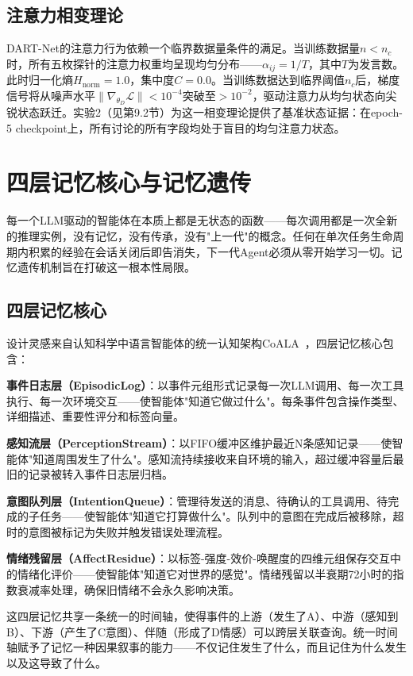 \documentclass[12pt,a4paper]{ctexart}
\begin{document}
\subsection{注意力相变理论}

DART-Net的注意力行为依赖一个临界数据量条件的满足。当训练数据量$n < n_c$时，所有五枚探针的注意力权重均呈现均匀分布——$\alpha_{ij} = 1/T$，其中$T$为发言数。此时归一化熵$H_{\text{norm}} = 1.0$，集中度$C = 0.0$。当训练数据达到临界阈值$n_c$后，梯度信号将从噪声水平$\|\nabla_{\theta_D} \mathcal{L}\| < 10^{-4}$突破至$> 10^{-2}$，驱动注意力从均匀状态向尖锐状态跃迁。实验2（见第9.2节）为这一相变理论提供了基准状态证据：在epoch-5 checkpoint上，所有讨论的所有字段均处于盲目的均匀注意力状态。

\section{四层记忆核心与记忆遗传}

每一个LLM驱动的智能体在本质上都是无状态的函数——每次调用都是一次全新的推理实例，没有记忆，没有传承，没有"上一代"的概念。任何在单次任务生命周期内积累的经验在会话关闭后即告消失，下一代Agent必须从零开始学习一切。记忆遗传机制旨在打破这一根本性局限。

\subsection{四层记忆核心}

设计灵感来自认知科学中语言智能体的统一认知架构CoALA~\cite{sumers2023coala}，四层记忆核心包含：

\textbf{事件日志层（EpisodicLog）}：以事件元组形式记录每一次LLM调用、每一次工具执行、每一次环境交互——使智能体"知道它做过什么"。每条事件包含操作类型、详细描述、重要性评分和标签向量。

\textbf{感知流层（PerceptionStream）}：以FIFO缓冲区维护最近N条感知记录——使智能体"知道周围发生了什么"。感知流持续接收来自环境的输入，超过缓冲容量后最旧的记录被转入事件日志层归档。

\textbf{意图队列层（IntentionQueue）}：管理待发送的消息、待确认的工具调用、待完成的子任务——使智能体"知道它打算做什么"。队列中的意图在完成后被移除，超时的意图被标记为失败并触发错误处理流程。

\textbf{情绪残留层（AffectResidue）}：以标签-强度-效价-唤醒度的四维元组保存交互中的情绪化评价——使智能体"知道它对世界的感觉"。情绪残留以半衰期72小时的指数衰减率处理，确保旧情绪不会永久影响决策。

这四层记忆共享一条统一的时间轴，使得事件的上游（发生了A）、中游（感知到B）、下游（产生了C意图）、伴随（形成了D情感）可以跨层关联查询。统一时间轴赋予了记忆一种因果叙事的能力——不仅记住发生了什么，而且记住为什么发生以及这导致了什么。
\end{document}
